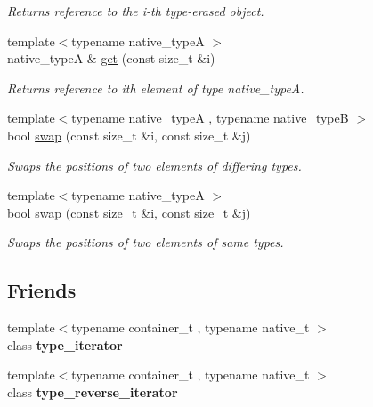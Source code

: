 \begin{DoxyCompactItemize}
\begin{DoxyCompactList}\small\item\em Returns reference to the i-\/th type-\/erased object. \end{DoxyCompactList}\item 
{\footnotesize template$<$typename native\+\_\+type\+A $>$ }\\native\+\_\+type\+A \& \hyperlink{classheterogeneous_1_1adaptor_ad19caaf6a3b4969206cb11b95cc45592}{get} (const size\+\_\+t \&i)
\begin{DoxyCompactList}\small\item\em Returns reference to ith element of type native\+\_\+type\+A. \end{DoxyCompactList}\item 
{\footnotesize template$<$typename native\+\_\+type\+A , typename native\+\_\+type\+B $>$ }\\bool \hyperlink{classheterogeneous_1_1adaptor_a7713117241f02ed8520ebdd8e038292d}{swap} (const size\+\_\+t \&i, const size\+\_\+t \&j)
\begin{DoxyCompactList}\small\item\em Swaps the positions of two elements of differing types. \end{DoxyCompactList}\item 
{\footnotesize template$<$typename native\+\_\+type\+A $>$ }\\bool \hyperlink{classheterogeneous_1_1adaptor_ac8d5edee453346cc7a6c7e5c01d34938}{swap} (const size\+\_\+t \&i, const size\+\_\+t \&j)
\begin{DoxyCompactList}\small\item\em Swaps the positions of two elements of same types. \end{DoxyCompactList}\end{DoxyCompactItemize}
\subsection*{Friends}
\begin{DoxyCompactItemize}
\item 
\hypertarget{classheterogeneous_1_1adaptor_a7fbb11b172f26d228db561218a26304c}{}{\footnotesize template$<$typename container\+\_\+t , typename native\+\_\+t $>$ }\\class {\bfseries type\+\_\+iterator}\label{classheterogeneous_1_1adaptor_a7fbb11b172f26d228db561218a26304c}

\item 
\hypertarget{classheterogeneous_1_1adaptor_ac56e6451307e2015ec248a73f8bf75b4}{}{\footnotesize template$<$typename container\+\_\+t , typename native\+\_\+t $>$ }\\class {\bfseries type\+\_\+reverse\+\_\+iterator}\label{classheterogeneous_1_1adaptor_ac56e6451307e2015ec248a73f8bf75b4}

\end{DoxyCompactItemize}


